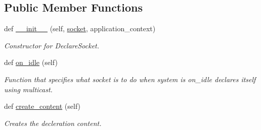 \subsection*{Public Member Functions}
\begin{DoxyCompactItemize}
\item 
def \hyperlink{class_r_a_i_d5_1_1block__device_1_1pollables_1_1declarer__socket_1_1_declarer_socket_a0da7f9ba5573de93db76bd439e2aea6a}{\+\_\+\+\_\+init\+\_\+\+\_\+} (self, \hyperlink{class_r_a_i_d5_1_1block__device_1_1pollables_1_1declarer__socket_1_1_declarer_socket_ae5cf6477968fe119eed756e117ed2db2}{socket}, application\+\_\+context)
\begin{DoxyCompactList}\small\item\em Constructor for Declare\+Socket. \end{DoxyCompactList}\item 
\mbox{\label{class_r_a_i_d5_1_1block__device_1_1pollables_1_1declarer__socket_1_1_declarer_socket_a379743c1568dc3f74d2b449ddabfbf58}} 
def \hyperlink{class_r_a_i_d5_1_1block__device_1_1pollables_1_1declarer__socket_1_1_declarer_socket_a379743c1568dc3f74d2b449ddabfbf58}{on\+\_\+idle} (self)
\begin{DoxyCompactList}\small\item\em Function that specifies what socket is to do when system is on\+\_\+idle declares itself using multicast. \end{DoxyCompactList}\item 
\mbox{\label{class_r_a_i_d5_1_1block__device_1_1pollables_1_1declarer__socket_1_1_declarer_socket_a24329fed18e547225275086cfa45d98a}} 
def \hyperlink{class_r_a_i_d5_1_1block__device_1_1pollables_1_1declarer__socket_1_1_declarer_socket_a24329fed18e547225275086cfa45d98a}{create\+\_\+content} (self)
\begin{DoxyCompactList}\small\item\em Creates the decleration content. \end{DoxyCompactList}\item 
\mbox{\label{class_r_a_i_d5_1_1block__device_1_1pollables_1_1declarer__socket_1_1_declarer_socket_af352950a82cb5b16a342af8025a29c8a}} 

\end{DoxyCompactItemize}
